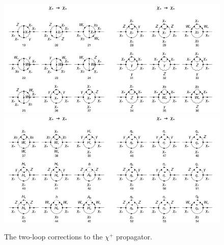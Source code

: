\documentclass[11pt]{article}
\begin{document}
\begin{figure}[h!]
\includegraphics[width=0.5\textwidth]{diagrams_F[1]_2_3.pdf}\includegraphics[width=0.5\textwidth]{diagrams_F[1]_2_4.pdf}
\includegraphics[width=0.5\textwidth]{diagrams_F[1]_2_5.pdf}\includegraphics[width=0.5\textwidth]{diagrams_F[1]_2_6.pdf}
\caption{The two-loop corrections to the $\chi^+$ propagator.}\label{fig:chi1chi1_1}
\end{figure}
\end{document}
